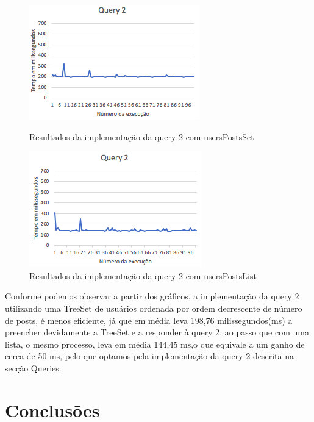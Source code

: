 \documentclass[a4paper]{article}
\begin{document}
\begin{figure}[H]
    \centering
    \begin{minipage}[b]{0.4\textwidth}
    \includegraphics[scale=0.7]{Query2_Set}
    \caption{Resultados da implementação da query 2 com usersPostsSet}
    \label{figRotulo}
  \end{minipage}
 \hfill
   \begin{minipage}[b]{0.5\textwidth}
      \includegraphics[scale=0.7]{Query2_List}
      \caption{Resultados da implementação da query 2 com usersPostsList}
      \label{figRotulo}
      \end{minipage}
    \end{figure}

    \vspace{0.4cm}

Conforme podemos observar a partir dos gráficos, a implementação da query 2 utilizando
uma TreeSet de usuários ordenada por ordem decrescente de número de posts,
é menos eficiente, já que em média leva 198,76 milissegundos(ms) a preencher
devidamente a TreeSet e a responder à query 2, ao passo que com uma lista,
o mesmo processo, leva em média 144,45 ms,o que equivale a um ganho de cerca de
50 ms, pelo que optamos pela implementação da query 2 descrita na secção Queries.

\section{Conclusões}
\label{sec:conclusao}
\end{document}
